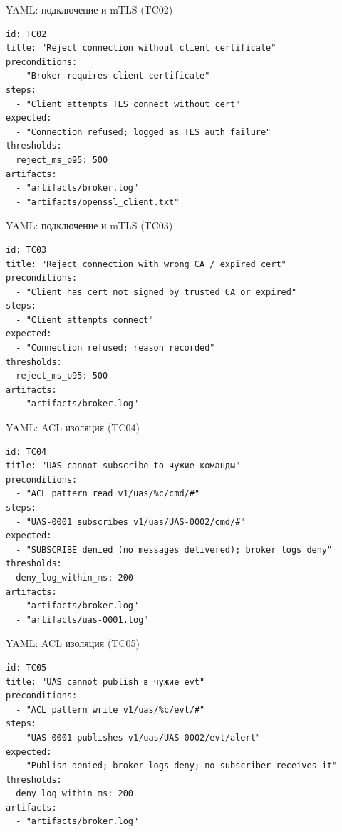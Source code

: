 \documentclass[aspectratio=169]{beamer}
\begin{document}
\begin{frame}[fragile]{YAML: подключение и mTLS (TC02)}
\begin{Verbatim}[fontsize=\scriptsize, baselinestretch=0.85]  
id: TC02
title: "Reject connection without client certificate"
preconditions:
  - "Broker requires client certificate"
steps:
  - "Client attempts TLS connect without cert"
expected:
  - "Connection refused; logged as TLS auth failure"
thresholds:
  reject_ms_p95: 500
artifacts:
  - "artifacts/broker.log"
  - "artifacts/openssl_client.txt"

\end{Verbatim}
\end{frame}

\begin{frame}[fragile]{YAML: подключение и mTLS (TC03)}
\begin{Verbatim}[fontsize=\scriptsize, baselinestretch=0.85]  
id: TC03
title: "Reject connection with wrong CA / expired cert"
preconditions:
  - "Client has cert not signed by trusted CA or expired"
steps:
  - "Client attempts connect"
expected:
  - "Connection refused; reason recorded"
thresholds:
  reject_ms_p95: 500
artifacts:
  - "artifacts/broker.log"
\end{Verbatim}
\end{frame}

\begin{frame}[fragile]{YAML: ACL изоляция (TC04)}
\begin{Verbatim}[fontsize=\scriptsize, baselinestretch=0.85]
id: TC04
title: "UAS cannot subscribe to чужие команды"
preconditions:
  - "ACL pattern read v1/uas/%c/cmd/#"
steps:
  - "UAS-0001 subscribes v1/uas/UAS-0002/cmd/#"
expected:
  - "SUBSCRIBE denied (no messages delivered); broker logs deny"
thresholds:
  deny_log_within_ms: 200
artifacts:
  - "artifacts/broker.log"
  - "artifacts/uas-0001.log"

\end{Verbatim}
\end{frame}
\begin{frame}[fragile]{YAML: ACL изоляция (TC05)}
\begin{Verbatim}[fontsize=\scriptsize, baselinestretch=0.85]  
id: TC05
title: "UAS cannot publish в чужие evt"
preconditions:
  - "ACL pattern write v1/uas/%c/evt/#"
steps:
  - "UAS-0001 publishes v1/uas/UAS-0002/evt/alert"
expected:
  - "Publish denied; broker logs deny; no subscriber receives it"
thresholds:
  deny_log_within_ms: 200
artifacts:
  - "artifacts/broker.log"
\end{Verbatim}
\end{frame}
\end{document}
